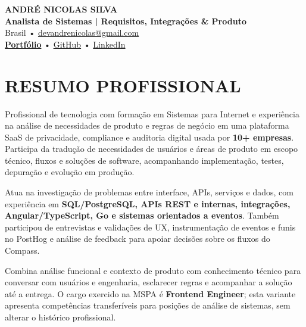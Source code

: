 \documentclass[10pt,a4paper]{article}
\begin{document}

\begin{center}

    {\LARGE \textbf{ANDRÉ NICOLAS SILVA}} \\[-2pt]

    {\normalsize \textbf{Analista de Sistemas | Requisitos, Integrações \& Produto}} \\[1pt]

    \footnotesize
    Brasil \quad • \quad
    \href{mailto:devandrenicolas@gmail.com}{devandrenicolas@gmail.com} \\[-1pt]

    \textbf{\href{https://portfolio-andrenicolas.vercel.app}{Portfólio}}
    \quad • \quad
    \href{https://github.com/devAndreNicolas}{GitHub}
    \quad • \quad
    \href{https://www.linkedin.com/in/devandrenicolas}{LinkedIn}

\end{center}

\vspace{-3pt}


\section*{RESUMO PROFISSIONAL}

\footnotesize

Profissional de tecnologia com formação em Sistemas para Internet e experiência na análise de necessidades de produto e regras de negócio em uma plataforma SaaS de privacidade, compliance e auditoria digital usada por \textbf{10+ empresas}. Participa da tradução de necessidades de usuários e áreas de produto em escopo técnico, fluxos e soluções de software, acompanhando implementação, testes, depuração e evolução em produção.

Atua na investigação de problemas entre interface, APIs, serviços e dados, com experiência em \textbf{SQL/PostgreSQL, APIs REST e internas, integrações, Angular/TypeScript, Go e sistemas orientados a eventos}. Também participou de entrevistas e validações de UX, instrumentação de eventos e funis no PostHog e análise de feedback para apoiar decisões sobre os fluxos do Compass.

Combina análise funcional e contexto de produto com conhecimento técnico para conversar com usuários e engenharia, esclarecer regras e acompanhar a solução até a entrega. O cargo exercido na MSPA é \textbf{Frontend Engineer}; esta variante apresenta competências transferíveis para posições de análise de sistemas, sem alterar o histórico profissional.
\end{document}
